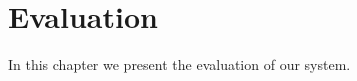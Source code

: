 \chapter{Evaluation}\label{ch:evaluation}

In this chapter we present the evaluation of our system.
